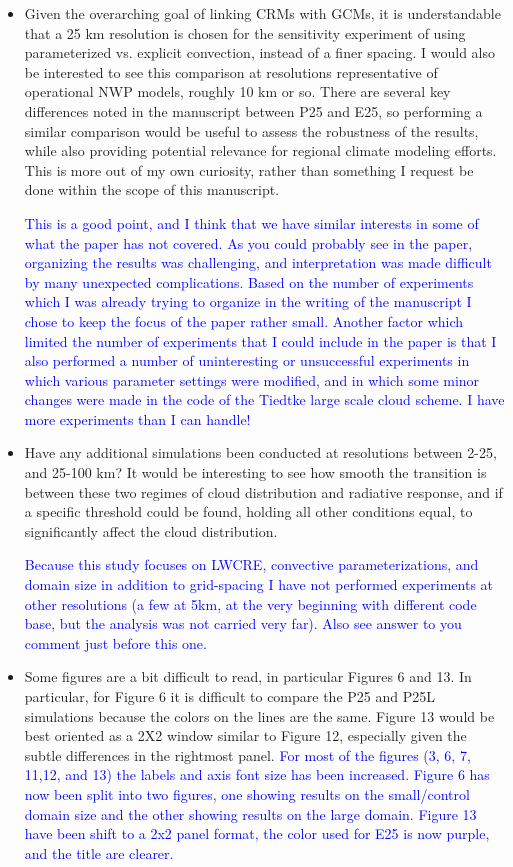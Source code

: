 \documentclass[draft]{agujournal2019}
\begin{document}
\begin{itemize}
  \item Given the overarching goal of linking CRMs with GCMs, it is understandable that a 25 km resolution is chosen for the sensitivity experiment of using parameterized vs. explicit convection, instead of a finer spacing. I would also be interested to see this comparison at resolutions representative of operational NWP models, roughly 10 km or so. There are several key differences noted in the manuscript between P25 and E25, so performing a similar comparison would be useful to assess the robustness of the results, while also providing potential relevance for regional climate modeling efforts. This is more out of my own curiosity, rather than something I request be done within the scope of this manuscript.  

  \textcolor{blue}{This is a good point, and I think that we have similar interests in some of what the paper has not covered.  As you could probably see in the paper, organizing the results was challenging, and interpretation was made difficult by many unexpected complications.  Based on the number of experiments which I was already trying to organize in the writing of the manuscript I chose to keep the focus of the paper rather small.   Another factor which limited the number of experiments that I could include in the paper is that I also performed a number of uninteresting or unsuccessful experiments in which various parameter settings were modified, and in which some minor changes were made in the code of the Tiedtke large scale cloud scheme.  I have more experiments than I can handle! }

  \item Have any additional simulations been conducted at resolutions between 2-25, and 25-100 km? It would be interesting to see how smooth the transition is between these two regimes of cloud distribution and radiative response, and if a specific threshold could be found, holding all other conditions equal, to significantly affect the cloud distribution.  

  \textcolor{blue}{Because this study focuses on LWCRE, convective parameterizations, and domain size in addition to grid-spacing I have not performed experiments at other resolutions (a few at 5km, at the very beginning with different code base, but the analysis was not carried very far).  Also see answer to you comment just before this one. }

  \item Some figures are a bit difficult to read, in particular Figures 6 and 13. In particular, for Figure 6 it is difficult to compare the P25 and P25L simulations because the colors on the lines are the same. Figure 13 would be best oriented as a 2X2 window similar to Figure 12, especially given the subtle differences in the rightmost panel.
  \textcolor{blue}{For most of the figures (3, 6, 7, 11,12, and 13) the labels and axis font size has been increased.  
  Figure 6 has now been split into two figures, one showing results on the small/control domain size and the other showing 
  results on the large domain.  Figure 13 have been shift to a 2x2 panel format, the color used for E25 is now purple, and the 
  title are clearer.}


\end{itemize}
\end{document}
